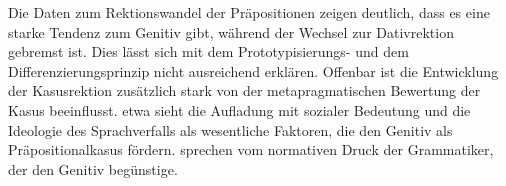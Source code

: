 Die Daten zum Rektionswandel der Präpositionen zeigen deutlich, dass es eine starke Tendenz zum Genitiv gibt, während der Wechsel zur Dativrektion gebremst ist. 
Dies lässt sich mit dem Prototypisierungs- und dem Differenzierungsprinzip nicht ausreichend erklären. 
Offenbar ist die Entwicklung der Kasusrektion zusätzlich stark von der metapragmatischen Bewertung der Kasus beeinflusst. 
\citet[33--34]{Szczepaniak2014} etwa sieht die Aufladung mit sozialer Bedeutung und die Ideologie des Sprachverfalls als wesentliche Faktoren, die den Genitiv als Pr{\"a}positionalkasus f{\"o}rdern. 
\citet[36]{Lehmann1992} sprechen vom \glqq normativen Druck der Grammatiker\grqq{}, der den Genitiv begünstige. 
